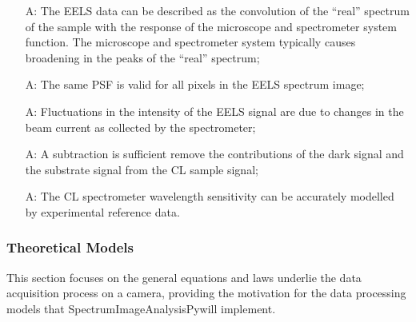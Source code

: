 \documentclass[12pt]{article}
\newcounter{assumpnum} %
\newcommand{\progname}{SpectrumImageAnalysisPy} %
\begin{document}
\begin{itemize}

	\item[A\refstepcounter{assumpnum}\theassumpnum \label{EELS_System_Response}:] The EELS data can be described as the convolution of the ``real'' spectrum of the sample with the response of the microscope and spectrometer system function. The microscope and spectrometer system typically causes broadening in the peaks of the ``real'' spectrum;
	
	\item[A\refstepcounter{assumpnum}\theassumpnum \label{EELS_PSF_variability}:] The same PSF is valid for all pixels in the EELS spectrum image;
	
	\item[A\refstepcounter{assumpnum}\theassumpnum \label{EELS_Intensity_Fluctuations}:] Fluctuations in the intensity of the EELS signal are due to changes in the beam current as collected by the spectrometer;
	
	\item[A\refstepcounter{assumpnum}\theassumpnum \label{CL_Background}:] A subtraction is sufficient remove the contributions of the dark signal and the substrate signal from the CL sample signal;
	
	\item[A\refstepcounter{assumpnum}\theassumpnum \label{CL_System_Response}:] The CL spectrometer wavelength sensitivity can be accurately modelled by experimental reference data.

\end{itemize}

\subsubsection{Theoretical Models}\label{sec_theoretical}

This section focuses on the general equations and laws underlie the data acquisition process on a camera, providing the motivation for the data processing models that \progname  will implement.

~\newline
\end{document}
